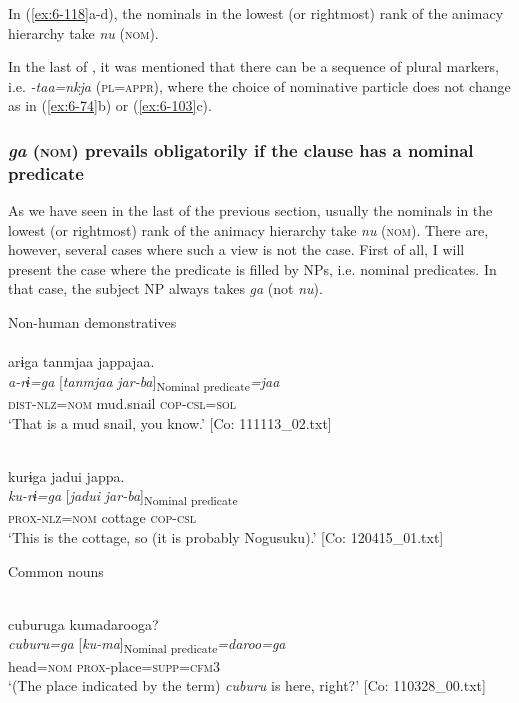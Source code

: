 In (\ref{ex:6-118}a-d), the nominals in the lowest (or rightmost) rank of the animacy hierarchy take \textit{nu} (\textsc{nom}).

  In the last of , it was mentioned that there can be a sequence of plural markers, i.e. \textit{-taa=nkja} (\textsc{pl}=\textsc{appr}), where the choice of nominative particle does not change as in (\ref{ex:6-74}b) or (\ref{ex:6-103}c).

\subsubsection{\textit{ga} (\textsc{nom}) prevails obligatorily if the clause has a nominal predicate}

As we have seen in the last of the previous section, usually the nominals in the lowest (or rightmost) rank of the animacy hierarchy take \textit{nu} (\textsc{nom}). There are, however, several cases where such a view is not the case. First of all, I will present the case where the predicate is filled by NPs, i.e. nominal predicates. In that case, the subject NP always takes \textit{ga} (not \textit{nu}).

\ea\label{ex:6-119}
 Non-human demonstratives\\

 \ea{}\\
{\TM}
\glll  arɨga  tanmjaa  jappajaa.\\
\textit{a-rɨ=ga}  [\textit{tanmjaa}  \textit{jar-ba}]\textsubscript{Nominal predicate}\textit{=jaa}\\
\textsc{dist}-\textsc{nlz}=\textsc{nom}  mud.snail  \textsc{cop}-\textsc{csl}=\textsc{sol}\\
\glt ‘That is a mud snail, you know.’ [Co: 111113\_02.txt]
\z

\ex{}\\
{\TM}
\glll  kurɨga  jadui  jappa.\\
\textit{ku-rɨ=ga}  [\textit{jadui}  \textit{jar-ba}]\textsubscript{Nominal predicate}\\
\textsc{prox}-\textsc{nlz}=\textsc{nom}  cottage  \textsc{cop}-\textsc{csl}\\
\glt ‘This is the cottage, so (it is probably Nogusuku).’ [Co: 120415\_01.txt]
\z

  Common nouns

\ex{}\\
{\TM}
\glll  cuburuga  kumadarooga?\\
\textit{cuburu=ga}  [\textit{ku-ma}]\textsubscript{Nominal predicate}\textit{=daroo=ga}\\
head=\textsc{nom}  \textsc{prox}-place=\textsc{supp}=\textsc{cfm}3\\
\glt ‘(The place indicated by the term) \textit{cuburu} is here, right?’ [Co: 110328\_00.txt]
\z

